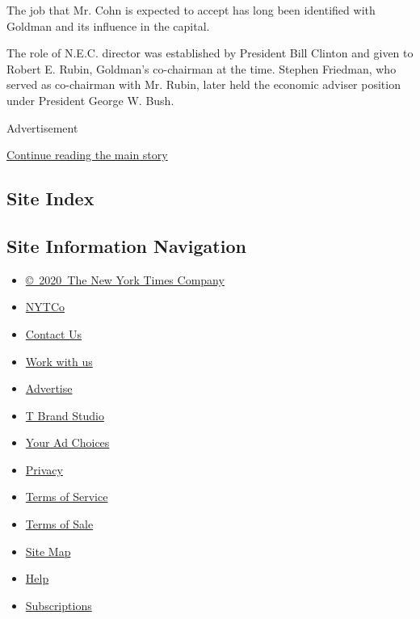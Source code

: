 The job that Mr. Cohn is expected to accept has long been identified
with Goldman and its influence in the capital.

The role of N.E.C. director was established by President Bill Clinton
and given to Robert E. Rubin, Goldman's co-chairman at the time. Stephen
Friedman, who served as co-chairman with Mr. Rubin, later held the
economic adviser position under President George W. Bush.

Advertisement

\protect\hyperlink{after-bottom}{Continue reading the main story}

\hypertarget{site-index}{%
\subsection{Site Index}\label{site-index}}

\hypertarget{site-information-navigation}{%
\subsection{Site Information
Navigation}\label{site-information-navigation}}

\begin{itemize}
\tightlist
\item
  \href{https://help.nytimes3xbfgragh.onion/hc/en-us/articles/115014792127-Copyright-notice}{©~2020~The
  New York Times Company}
\end{itemize}

\begin{itemize}
\tightlist
\item
  \href{https://www.nytco.com/}{NYTCo}
\item
  \href{https://help.nytimes3xbfgragh.onion/hc/en-us/articles/115015385887-Contact-Us}{Contact
  Us}
\item
  \href{https://www.nytco.com/careers/}{Work with us}
\item
  \href{https://nytmediakit.com/}{Advertise}
\item
  \href{http://www.tbrandstudio.com/}{T Brand Studio}
\item
  \href{https://www.nytimes3xbfgragh.onion/privacy/cookie-policy\#how-do-i-manage-trackers}{Your
  Ad Choices}
\item
  \href{https://www.nytimes3xbfgragh.onion/privacy}{Privacy}
\item
  \href{https://help.nytimes3xbfgragh.onion/hc/en-us/articles/115014893428-Terms-of-service}{Terms
  of Service}
\item
  \href{https://help.nytimes3xbfgragh.onion/hc/en-us/articles/115014893968-Terms-of-sale}{Terms
  of Sale}
\item
  \href{https://spiderbites.nytimes3xbfgragh.onion}{Site Map}
\item
  \href{https://help.nytimes3xbfgragh.onion/hc/en-us}{Help}
\item
  \href{https://www.nytimes3xbfgragh.onion/subscription?campaignId=37WXW}{Subscriptions}
\end{itemize}
